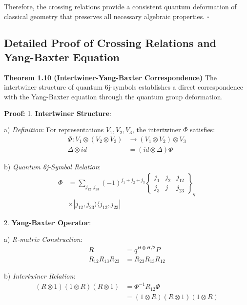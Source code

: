 \documentclass[12pt,a4paper]{article}
\begin{document}
Therefore, the crossing relations provide a consistent quantum deformation of classical geometry that preserves all necessary algebraic properties. $\square$

\subsection{Detailed Proof of Crossing Relations and Yang-Baxter Equation}

\textbf{Theorem 1.10 (Intertwiner-Yang-Baxter Correspondence)}
The intertwiner structure of quantum 6j-symbols establishes a direct correspondence with the Yang-Baxter equation through the quantum group deformation.

\textbf{Proof:}
1. \textbf{Intertwiner Structure}:
   
   a) \textit{Definition}:
      For representations $V_1, V_2, V_3$, the intertwiner $\Phi$ satisfies:
      \[
      \begin{aligned}
      \Phi: V_1 \otimes (V_2 \otimes V_3) &\rightarrow (V_1 \otimes V_2) \otimes V_3 \\
      \Delta \otimes id &= (id \otimes \Delta)\Phi
      \end{aligned}
      \]
   
   b) \textit{Quantum 6j-Symbol Relation}:
      \[
      \begin{aligned}
      \Phi &= \sum_{j_{12},j_{23}} (-1)^{j_1+j_2+j_3} 
      \begin{Bmatrix} 
      j_1 & j_2 & j_{12} \\
      j_3 & j & j_{23}
      \end{Bmatrix}_q \\
      &\times |j_{12},j_{23}\rangle\langle j_{12},j_{23}|
      \end{aligned}
      \]

2. \textbf{Yang-Baxter Operator}:
   
   a) \textit{R-matrix Construction}:
      \[
      \begin{aligned}
      R &= q^{H \otimes H/2}P \\
      R_{12}R_{13}R_{23} &= R_{23}R_{13}R_{12}
      \end{aligned}
      \]
   
   b) \textit{Intertwiner Relation}:
      \[
      \begin{aligned}
      (R \otimes 1)(1 \otimes R)(R \otimes 1) &= \Phi^{-1}R_{12}\Phi \\
      &= (1 \otimes R)(R \otimes 1)(1 \otimes R)
      \end{aligned}
      \]
\end{document}
